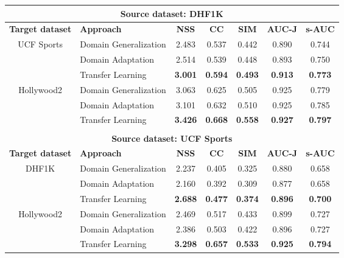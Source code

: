 \begin{table*}[ht!]
        \centering
        \begin{tabular}{c|lccccc}
            \toprule
            \multicolumn{7}{c}{\textbf{Source dataset: DHF1K}}\\ 
            \midrule
            \textbf{Target dataset} &\textbf{Approach} & \textbf{NSS} & \textbf{CC} & \textbf{SIM} & \textbf{AUC-J} & \textbf{s-AUC} \\
            \midrule
            \multirow{3}{*}{UCF Sports} &Domain Generalization  &  2.483 & 0.537 & 0.442 & 0.890 & 0.744 \\
            &Domain Adaptation  & 2.514 &  0.539    & 0.448 &  0.893 & 0.750 \\
            &Transfer Learning  &\textbf{ 3.001} &  \textbf{0.594}   & \textbf{0.493}    &  \textbf{0.913} & \textbf{0.773} \\
            \midrule
            \multirow{3}{*}{Hollywood2} &Domain Generalization  &  3.063 & 0.625 & 0.505 & 0.925 & 0.779 \\
            &Domain Adaptation  & 3.101 &  0.632   & 0.510 &  0.925 & 0.785 \\
            &Transfer Learning  & \textbf{3.426}    &  \textbf{0.668}    &  \textbf{0.558}    &  \textbf{0.927} & \textbf{0.797} \\
            \midrule
            \multicolumn{7}{c}{} \\
            \toprule
            \multicolumn{7}{c}{\textbf{Source dataset: UCF Sports}}\\ 
            \midrule
            \textbf{Target dataset} &\textbf{Approach} & \textbf{NSS} & \textbf{CC} & \textbf{SIM} & \textbf{AUC-J} & \textbf{s-AUC} \\
            \midrule
            \multirow{3}{*}{DHF1K} &Domain Generalization  &  2.237 & 0.405 & 0.325 & 0.880 & 0.658 \\
            &Domain Adaptation  & 2.160 &  0.392    & 0.309 &  0.877 & 0.658 \\
            &Transfer Learning  & \textbf{2.688}    &  \textbf{0.477}    & \textbf{0.374}   &  \textbf{0.896} & \textbf{0.700} \\
            \midrule
            \multirow{3}{*}{Hollywood2} &Domain Generalization  &  2.469 & 0.517 & 0.433 & 0.899 & 0.727 \\
            &Domain Adaptation  & 2.386 &  0.503   & 0.422 &  0.896 & 0.727 \\
            &Transfer Learning  & \textbf{3.298}    &  \textbf{0.657}    & \textbf{0.533}    &  \textbf{0.925} & \textbf{0.794} \\

\end{tabular}
\end{table*}
